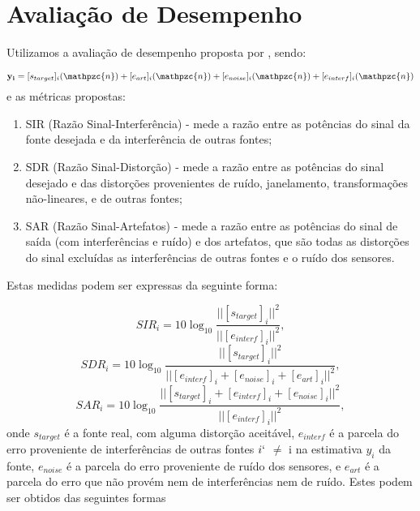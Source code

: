 \section{Avaliação de Desempenho}
    Utilizamos a avaliação de desempenho proposta por \cite{performance}, sendo:
    
    \begin{equation}
         \mathbf{y_i} = [s_{target}]_i(\mathpzc{n})  + [e_{art}]_i(\mathpzc{n})  +  [e_{noise}]_i(\mathpzc{n}) +  [e_{interf}]_i(\mathpzc{n})
    \end{equation}
    e as métricas propostas:
    
    \begin{enumerate}
        \item SIR (Razão Sinal-Interferência) - mede a razão entre as potências do sinal da fonte desejada e da interferência de outras fontes;
        \item SDR (Razão Sinal-Distorção) - mede a razão entre as potências do sinal desejado e das distorções provenientes de ruído, janelamento, transformações não-lineares, e de outras fontes;
        \item SAR (Razão Sinal-Artefatos) - mede a razão entre as potências do sinal de saída (com interferências e ruído) e dos artefatos, que são todas as distorções do sinal excluídas as interferências de outras fontes e o ruído dos sensores.
    \end{enumerate}
    
    Estas medidas podem ser expressas da seguinte forma:
    
    \begin{equation}
        \label{eq:sir}
        SIR_i = 10\log_{10} \frac{|| [s_{target}]_i ||^2}{|| [e_{interf}]_i ||^2},
    \end{equation}
    \medskip
    \begin{equation}
        \label{eq:sdr}
        SDR_i = 10\log_{10} \frac{|| [s_{target}]_i ||^2}{|| [e_{interf}]_i + [e_{noise}]_i + [e_{art}]_i   ||^2},
    \end{equation}
    \medskip
    \begin{equation}
        \label{eq:sar}
        SAR_i = 10\log_{10} \frac{|| [s_{target}]_i + [e_{interf}]_i + [e_{noise}]_i ||^2}{|| [e_{interf}]_i ||^2},
    \end{equation}
    onde $s_{target}$ é a fonte real, com alguma distorção aceitável, $e_{interf}$  é a parcela do erro
proveniente de interferências de outras fontes $i`$ $\neq$ i na estimativa $y_i$ da fonte, $e_{noise}$
é a parcela do erro proveniente de ruído dos sensores, e $e_{art}$ é a parcela do erro que não provém nem de interferências nem de ruído. Estes podem ser obtidos das seguintes formas

